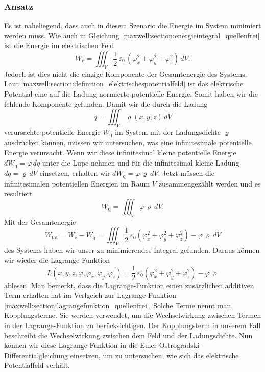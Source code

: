 \subsubsection{Ansatz}
Es ist naheliegend, dass auch in diesem Szenario die Energie im System minimiert werden muss.
Wie auch in Gleichung \eqref{maxwell:section:energieintegral_quellenfrei} ist die Energie im elektrischen Feld
\[
W_{\text{e}}
=
\iiint_V \frac{1}{2}\,\varepsilon_0\,(\varphi_x^2 + \varphi_y^2 + \varphi_z^2)\, dV.
\]
Jedoch ist dies nicht die einzige Komponente der Gesamtenergie des Systems.
Laut \eqref{maxwell:section:definition_elektrischespotentialfeld} ist das elektrische Potential eine auf die Ladung normierte potentielle Energie.
Somit haben wir die fehlende Komponente gefunden.
Damit wir die durch die Ladung
\begin{equation}
q
=
\iiint_V \varrho(x,y,z)\, dV
\label{maxwell:ladung}
\end{equation}
verursachte potentielle Energie $W_{\text{q}}$ im System mit der Ladungsdichte $\varrho$ ausdrücken können, müssen wir untersuchen, was eine infinitesimale potentielle Energie verursacht.
Wenn wir diese infinitesimal kleine potentielle Energie
\(
dW_{\text{q}}
=
\varphi\, dq
\)
unter die Lupe nehmen und für die infinitesimal kleine Ladung
\(
dq
=
\varrho\, dV
\)
einsetzen, erhalten wir
\(
dW_{\text{q}}
=
\varphi\,\varrho\, dV.
\)
Jetzt müssen die infinitesimalen potentiellen Energien im Raum $V$ zusammengezählt werden und es resultiert
\begin{equation}
W_{\text{q}}
=
\iiint_V \varphi\,\varrho\, dV.
\label{maxwell:section:potenzielle_energie_ladung}
\end{equation}
Mit der Gesamtenergie
\[
W_{\text{tot}}
=
W_{\text{e}} - W_{\text{q}}
=
\iiint_V \frac{1}{2}\,\varepsilon_0\left(\varphi_x^2 + \varphi_y^2 + \varphi_z^2\right) - \varphi\,\varrho\, dV
\]
des Systems haben wir unser zu minimierendes Integral gefunden.
Daraus können wir wieder die Lagrange-Funktion
\begin{equation}
L(x,y,z,\varphi,\varphi_x,\varphi_y,\varphi_z)
=
\frac{1}{2}\,\varepsilon_0\left(\varphi_x^2 + \varphi_y^2 + \varphi_z^2\right) - \varphi\,\varrho
\label{maxwell:section:lagrangefunktion_mit_quelle}
\end{equation}
ablesen.
Man bemerkt, dass die Lagrange-Funktion einen zusätzlichen additiven Term erhalten hat im Verlgeich zur Lagrange-Funktion \eqref{maxwell:section:lagrangefunktion_quellenfrei}.
Solche Terme nennt man Kopplungsterme.
Sie werden verwendet, um die Wechselwirkung zwischen Termen in der Lagrange-Funktion zu berücksichtigen.
Der Kopplungsterm in unserem Fall beschreibt die Wechselwirkung zwischen dem Feld und der Ladungsdichte.
Nun können wir diese Lagrange-Funktion in die Euler-Ostrogradski-Differentialgleichung einsetzen, um zu untersuchen, wie sich das elektrische Potentialfeld verhält.

